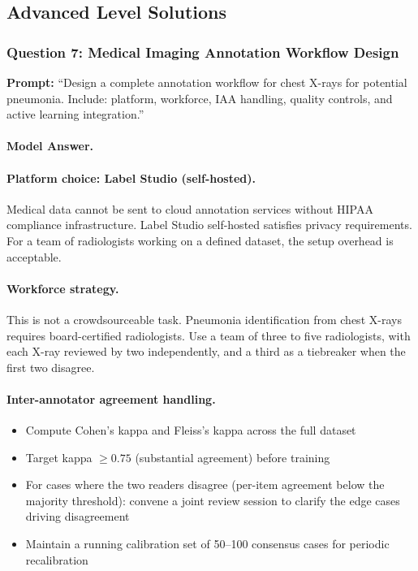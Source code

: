\subsection{Advanced Level Solutions}

\subsubsection{Question 7: Medical Imaging Annotation Workflow Design}

\textbf{Prompt:} ``Design a complete annotation workflow for chest X-rays for potential pneumonia. Include: platform, workforce, IAA handling, quality controls, and active learning integration.''

\paragraph{Model Answer.}

\paragraph{Platform choice: Label Studio (self-hosted).}
Medical data cannot be sent to cloud annotation services without HIPAA compliance infrastructure. Label Studio self-hosted satisfies privacy requirements. For a team of radiologists working on a defined dataset, the setup overhead is acceptable.

\paragraph{Workforce strategy.}
This is not a crowdsourceable task. Pneumonia identification from chest X-rays requires board-certified radiologists. Use a team of three to five radiologists, with each X-ray reviewed by two independently, and a third as a tiebreaker when the first two disagree.

\paragraph{Inter-annotator agreement handling.}
\begin{itemize}
    \item Compute Cohen's kappa and Fleiss's kappa across the full dataset
    \item Target kappa $\geq 0.75$ (substantial agreement) before training
    \item For cases where the two readers disagree (per-item agreement below the majority threshold): convene a joint review session to clarify the edge cases driving disagreement
    \item Maintain a running calibration set of 50--100 consensus cases for periodic recalibration
\end{itemize}

